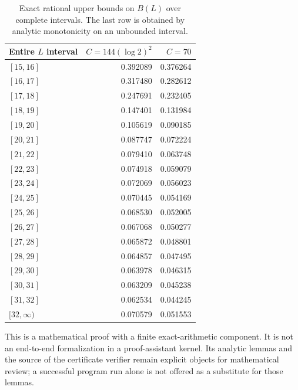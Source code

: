 \documentclass[10pt]{article}
\begin{document}
\begin{table}[ht]
\centering
\begin{tabular}{lrr}
\toprule
Entire $L$ interval & $C=144(\log2)^2$ & $C=70$\\
\midrule
$[15,16]$ & 0.392089 & 0.376264 \\
$[16,17]$ & 0.317480 & 0.282612 \\
$[17,18]$ & 0.247691 & 0.232405 \\
$[18,19]$ & 0.147401 & 0.131984 \\
$[19,20]$ & 0.105619 & 0.090185 \\
$[20,21]$ & 0.087747 & 0.072224 \\
$[21,22]$ & 0.079410 & 0.063748 \\
$[22,23]$ & 0.074918 & 0.059079 \\
$[23,24]$ & 0.072069 & 0.056023 \\
$[24,25]$ & 0.070445 & 0.054169 \\
$[25,26]$ & 0.068530 & 0.052005 \\
$[26,27]$ & 0.067068 & 0.050277 \\
$[27,28]$ & 0.065872 & 0.048801 \\
$[28,29]$ & 0.064857 & 0.047495 \\
$[29,30]$ & 0.063978 & 0.046315 \\
$[30,31]$ & 0.063209 & 0.045238 \\
$[31,32]$ & 0.062534 & 0.044245 \\
$[32,\infty)$ & 0.070579 & 0.051553 \\
\bottomrule
\end{tabular}
\caption{Exact rational upper bounds on $B(L)$ over complete intervals.
The last row is obtained by analytic monotonicity on an unbounded interval.}
\label{tab:slabs}
\end{table}

This is a mathematical proof with a finite exact-arithmetic component.
It is not an end-to-end formalization in a proof-assistant kernel. Its
analytic lemmas and the source of the certificate verifier remain explicit
objects for mathematical review; a successful program run alone is not
offered as a substitute for those lemmas.
\end{document}
